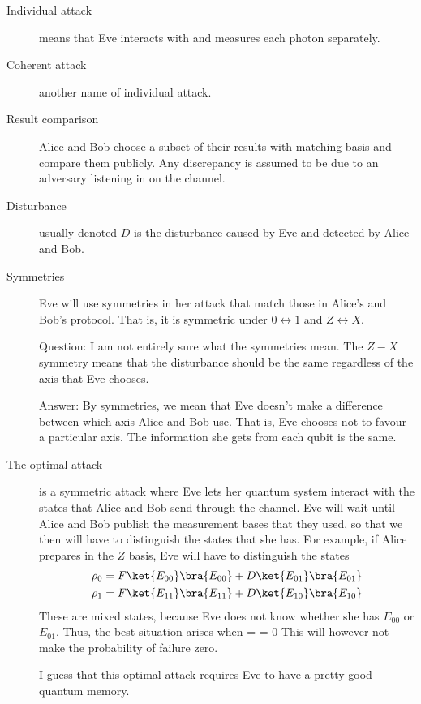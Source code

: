 \begin{description}
\item[Individual attack] means that Eve interacts with and measures each photon separately. 

\item[Coherent attack] another name of individual attack. 

\item[Result comparison] Alice and Bob choose a subset of their results with matching basis and compare them publicly. Any discrepancy is assumed to be due to an adversary listening in on the channel. 

\item[Disturbance] usually denoted $D$ is the disturbance caused by Eve and detected by Alice and Bob.

\item[Symmetries] Eve will use symmetries in her attack that match those in Alice's and Bob's protocol. That is, it is symmetric under $0 \leftrightarrow 1$ and $Z \leftrightarrow X$. 

Question: I am not entirely sure what the symmetries mean. The $Z-X$ symmetry means that the disturbance should be the same regardless of the axis that Eve chooses. 

Answer: By symmetries, we mean that Eve doesn't make a difference between which axis Alice and Bob use. That is, Eve chooses not to favour a particular axis. The information she gets from each qubit is the same. 

\item[The optimal attack] is a symmetric attack where Eve lets her quantum system interact with the states that Alice and Bob send through the channel. Eve will wait until Alice and Bob publish the measurement bases that they used, so that we then will have to distinguish the states that she has. For example, if Alice prepares in the $Z$ basis, Eve will have to distinguish the states
\begin{align}
\rho_0 &= F \ket{E_{00}} \bra{E_{00}} + D \ket{E_{01}}\bra{E_{01}} \\
\rho_1 & = F \ket{E_{11}}\bra{E_{11}}  + D\ket{E_{10}}\bra{E_{10}}
\end{align}
These are mixed states, because Eve does not know whether she has $E_{00}$ or $E_{01}$. Thus, the best situation arises when
\beq
{} =  = 0
\eeq
This will however not make the probability of failure zero. 

I guess that this optimal attack requires Eve to have a pretty good quantum memory.


\end{description}
